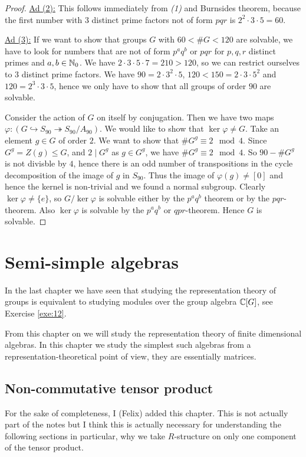 \documentclass[twoside = false,	%
		headsepline,		%
		parskip = true,
		]{scrbook}						%
\begin{document}
\begin{proof}
    \underline{Ad (2):}
        This follows immediately from \textit{(1)} and Burnsides theorem, because the first number with $3$ distinct prime factors not of form $pqr$ is $2^2 \cdot 3 \cdot 5 = 60$.
        
    \underline{Ad (3):}
        If we want to show that groups $G$ with $60<\#G<120$ are solvable, we have to look for numbers that are not of form $p^a q^b$ or $pqr$ for $p,q,r$ distinct primes and $a,b \in \mathbb N_0$. We have $2 \cdot 3 \cdot 5 \cdot 7 = 210 > 120$, so we can restrict ourselves to $3$ distinct prime factors. We have $90 = 2 \cdot 3^2 \cdot 5$, $120 < 150 = 2 \cdot 3 \cdot 5^2$ and $120 = 2^3 \cdot 3 \cdot 5 $, hence we only have to show that all groups of order $90$ are solvable.
        
        Consider the action of $G$ on itself by conjugation. Then we have two maps $\varphi:(G \hookrightarrow S_{90} \twoheadrightarrow S_{90}/A_{90})$. We would like to show that $\ker \varphi \neq G$. Take an element $g\in G$ of order $2$. We want to show that $\# G^g \equiv 2 \mod 4$. Since $G^g = Z(g) \leq G$, and $2 \mid G^g$ as $g \in G^g$, we have $\#G^g \equiv 2 \mod 4$. So $90 - \#G^g$ is not divisble by $4$, hence there is an odd number of transpositions in the cycle decomposition of the image of $g$ in $S_{90}$. Thus the image of $\varphi(g) \neq [0]$ and hence the kernel is non-trivial and we found a normal subgroup. Clearly $\ker \varphi \neq \{e\}$, so $G/\ker \varphi$ is solvable either by the $p^a q^b$ theorem or by the $pqr$-theorem. Also $\ker \varphi$ is solvable by the $p^aq^b$ or $qpr$-theorem. Hence $G$ is solvable.
        
    \end{proof}
    
\chapter{Semi-simple algebras}
    In the last chapter we have seen that studying the representation theory of groups is equivalent to studying modules over the group algebra $\mathbb C[G]$, see Exercise \ref{exe:12}.

    From this chapter on we will study the representation theory of finite dimensional algebras. In this chapter we study the simplest such algebras from a representation-theoretical point of view, they are essentially matrices.
\setcounter{section}{-1}
\section{Non-commutative tensor product}\label{non-commTP}
    For the sake of completeness, I (Felix) added this chapter. This is not actually part of the notes but I think this is actually necessary for understanding the following sections in particular, why we take $R$-structure on only one component of the tensor product.
\end{document}
